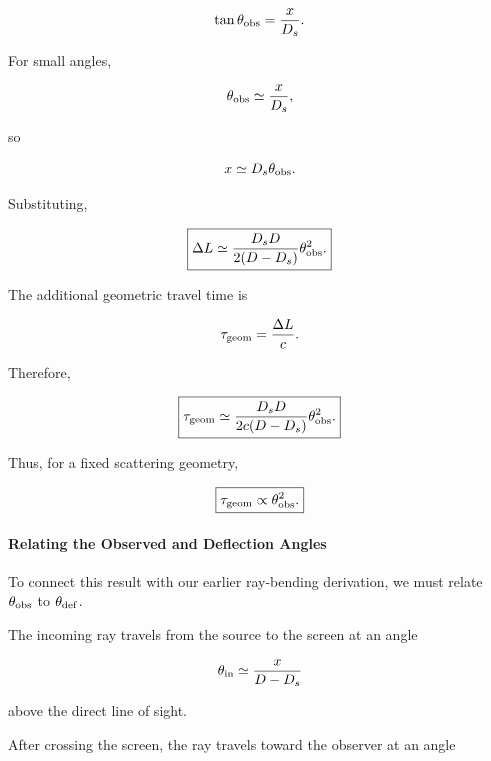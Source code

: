 \begin{equation}
\tan\theta_{\rm obs}
=
\frac{x}{D_s}.
\end{equation}

For small angles,

\begin{equation}
\theta_{\rm obs}\simeq\frac{x}{D_s},
\end{equation}

so

\begin{equation}
x\simeq D_s\theta_{\rm obs}.
\end{equation}

Substituting,

\begin{equation}
\boxed{
\Delta L\simeq
\frac{D_sD}{2(D-D_s)}
\theta_{\rm obs}^2.
}
\end{equation}

The additional geometric travel time is

\begin{equation}
\tau_{\rm geom}=\frac{\Delta L}{c}.
\end{equation}

Therefore,

\begin{equation}
\boxed{
\tau_{\rm geom}\simeq
\frac{D_sD}{2c(D-D_s)}
\theta_{\rm obs}^2.
}
\end{equation}

Thus, for a fixed scattering geometry,

\begin{equation}
\boxed{
\tau_{\rm geom}\propto\theta_{\rm obs}^2.
}
\end{equation}

\paragraph{Relating the Observed and Deflection Angles}

To connect this result with our earlier
ray-bending derivation, we must relate
$\theta_{\rm obs}$ to $\theta_{\rm def}$.

The incoming ray travels from the source
to the screen at an angle

\begin{equation}
\theta_{\rm in}\simeq
\frac{x}{D-D_s}
\end{equation}

above the direct line of sight.

After crossing the screen, the ray travels
toward the observer at an angle

